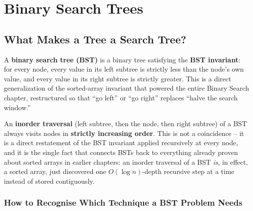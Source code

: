 \chapter{Binary Search Trees}

\section{What Makes a Tree a Search Tree?}
\label{sec:bst-intro}

A \textbf{binary search tree (BST)} is a binary tree satisfying the
\textbf{BST invariant}: for every node, every value in its left subtree
is strictly less than the node's own value, and every value in its right
subtree is strictly greater. This is a direct generalization of the
sorted-array invariant that powered the entire Binary Search chapter,
restructured so that ``go left'' or ``go right'' replaces ``halve the
search window.''

\begin{ideabox}
An \textbf{inorder traversal} (left subtree, then the node, then right
subtree) of a BST always visits nodes in \textbf{strictly increasing
order}. This is not a coincidence -- it is a direct restatement of the BST
invariant applied recursively at every node, and it is the single fact
that connects BSTs back to everything already proven about sorted arrays
in earlier chapters: an inorder traversal of a BST \emph{is}, in effect, a
sorted array, just discovered one $O(\log n)$-depth recursive step at a
time instead of stored contiguously.
\end{ideabox}

\subsection*{How to Recognise Which Technique a BST Problem Needs}

